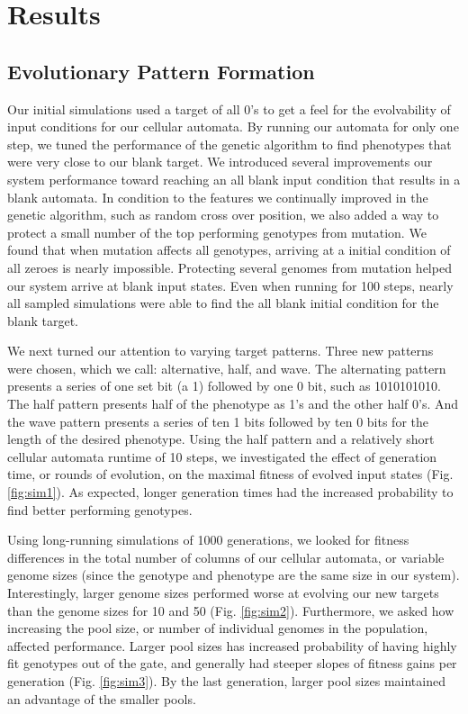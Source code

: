 \documentclass[twocolumn]{article}
\begin{document}
\section{Results}

\subsection{Evolutionary Pattern Formation}

Our initial simulations used a target of all 0's to get a feel for the evolvability of input conditions for our cellular automata.  By running our automata for only one step, we tuned the performance of the genetic algorithm to find phenotypes that were very close to our blank target.  We introduced several improvements our system performance toward reaching an all blank input condition that results in a blank automata.  In condition to the features we continually improved in the genetic algorithm, such as random cross over position, we also added a way to protect a small number of the top performing genotypes from mutation.  We found that when mutation affects all genotypes, arriving at a initial condition of all zeroes is nearly impossible.  Protecting several genomes from mutation helped our system arrive at blank input states.  Even when running for 100 steps, nearly all sampled simulations were able to find the all blank initial condition for the blank target.

We next turned our attention to varying target patterns.  Three new patterns were chosen, which we call: alternative, half, and wave.  The alternating pattern presents a series of one set bit (a 1) followed by one 0 bit, such as 1010101010.  The half pattern presents half of the phenotype as 1's and the other half 0's.  And the wave pattern presents a series of ten 1 bits followed by ten 0 bits for the length of the desired phenotype.  Using the half pattern and a relatively short cellular automata runtime of 10 steps, we investigated the effect of generation time, or rounds of evolution, on the maximal fitness of evolved input states (Fig. \ref{fig:sim1}).  As expected, longer generation times had the increased probability to find better performing genotypes.

Using long-running simulations of 1000 generations, we looked for fitness differences in the total number of columns of our cellular automata, or variable genome sizes (since the genotype and phenotype are the same size in our system).  Interestingly, larger genome sizes performed worse at evolving our new targets than the genome sizes for 10 and 50 (Fig. \ref{fig:sim2}).  Furthermore, we asked how increasing the pool size, or number of individual genomes in the population, affected performance.  Larger pool sizes has increased probability of having highly fit genotypes out of the gate, and generally had steeper slopes of fitness gains per generation (Fig. \ref{fig:sim3}).  By the last generation, larger pool sizes maintained an advantage of the smaller pools.
\end{document}
